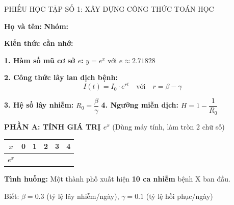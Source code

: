 \documentclass[12pt,a4paper]{article}
\begin{document}
\begin{phieuhoctap}{PHIẾU HỌC TẬP SỐ 1: XÂY DỰNG CÔNG THỨC TOÁN HỌC}

\noindent\textbf{Họ và tên:} \underline{\hspace{5cm}} \hfill \textbf{Nhóm:} \underline{\hspace{2cm}}

\vspace{0.5cm}
\begin{mathbox}
\textbf{Kiến thức cần nhớ:}

\textbf{1. Hàm số mũ cơ sở $e$:} $y = e^x$ với $e \approx 2.71828$

\textbf{2. Công thức lây lan dịch bệnh:}
$$\boxed{I(t) = I_0 \cdot e^{rt} \quad \text{với} \quad r = \beta - \gamma}$$

\textbf{3. Hệ số lây nhiễm:} $R_0 = \dfrac{\beta}{\gamma}$ \qquad \textbf{4. Ngưỡng miễn dịch:} $H = 1 - \dfrac{1}{R_0}$
\end{mathbox}

\vspace{0.5cm}
\textbf{\color{mathblue} PHẦN A: TÍNH GIÁ TRỊ $e^x$} (Dùng máy tính, làm tròn 2 chữ số)

\begin{center}
\begin{tabularx}{0.9\textwidth}{|C|C|C|C|C|C|}
\hline
$x$ & 0 & 1 & 2 & 3 & 4 \\
\hline
$e^x$ & \underline{\hspace{1.2cm}} & \underline{\hspace{1.2cm}} & \underline{\hspace{1.2cm}} & \underline{\hspace{1.2cm}} & \underline{\hspace{1.2cm}} \\
\hline
\end{tabularx}
\end{center}

\vspace{0.3cm}
\begin{problembox}
\textbf{Tình huống:} Một thành phố xuất hiện \textbf{10 ca nhiễm} bệnh X ban đầu.

Biết: $\beta = 0.3$ (tỷ lệ lây nhiễm/ngày), $\gamma = 0.1$ (tỷ lệ hồi phục/ngày)
\end{problembox}


\end{phieuhoctap}
\end{document}
